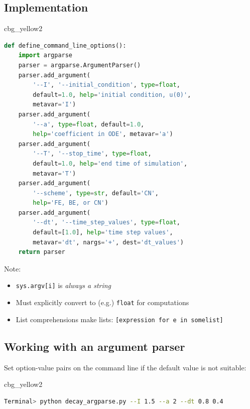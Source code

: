 \documentclass[%
oneside,                 %
final,                   %
10pt]{article}
\newenvironment{_cod_tight}[1]{
   \def\FrameCommand{\colorbox{#1}}
   \FrameRule0.6pt\MakeFramed {\FrameRestore}\vskip3mm}
   {\vskip0mm\endMakeFramed}
\newenvironment{cod}[1]{
\bgroup\rmfamily
\fboxsep=0mm\relax
\begin{_cod_tight}{#1}
\list{}{\parsep=-2mm\parskip=0mm\topsep=0pt\leftmargin=2mm
\rightmargin=2\leftmargin\leftmargin=4pt\relax}
\item\relax}
{\endlist\end{_cod_tight}\egroup}
\begin{document}
\subsection*{Implementation}

\begin{cod}{cbg_yellow2}\begin{lstlisting}[language=Python,style=simple,xleftmargin=2mm]
def define_command_line_options():
    import argparse
    parser = argparse.ArgumentParser()
    parser.add_argument(
        '--I', '--initial_condition', type=float,
        default=1.0, help='initial condition, u(0)',
        metavar='I')
    parser.add_argument(
        '--a', type=float, default=1.0,
        help='coefficient in ODE', metavar='a')
    parser.add_argument(
        '--T', '--stop_time', type=float,
        default=1.0, help='end time of simulation',
        metavar='T')
    parser.add_argument(
        '--scheme', type=str, default='CN',
        help='FE, BE, or CN')
    parser.add_argument(
        '--dt', '--time_step_values', type=float,
        default=[1.0], help='time step values',
        metavar='dt', nargs='+', dest='dt_values')
    return parser
\end{lstlisting}\end{cod}
\noindent

Note:

\begin{itemize}
  \item \texttt{sys.argv[i]} is \emph{always a string}

  \item Must explicitly convert to (e.g.) \texttt{float} for computations

  \item List comprehensions make lists: \texttt{[expression for e in somelist]}
\end{itemize}

\noindent
\subsection*{Working with an argument parser}

Set option-value pairs on the command line if the default value is not
suitable:

\begin{cod}{cbg_yellow2}\begin{lstlisting}[language=bash,style=simple,xleftmargin=2mm]
Terminal> python decay_argparse.py --I 1.5 --a 2 --dt 0.8 0.4
\end{lstlisting}\end{cod}
\noindent
\end{document}

